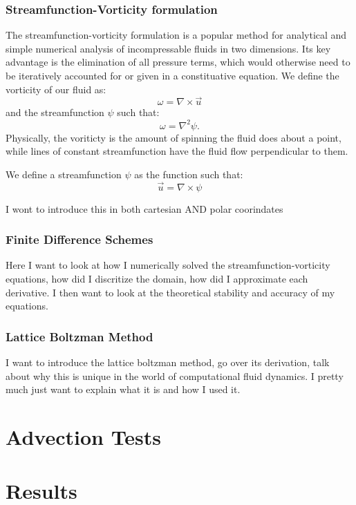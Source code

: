 \documentclass{article}
\begin{document}
\subsubsection*{Streamfunction-Vorticity formulation}
The streamfunction-vorticity formulation is a popular method for analytical and simple numerical analysis of incompressable fluids in two dimensions. Its key advantage is the elimination of all pressure terms, which would otherwise need to be iteratively accounted for or given in a constituative equation. We define the vorticity of our fluid as:
\begin{equation}
	\omega = \nabla \times \vec{u}
\end{equation}
and the streamfunction $\psi$ such that:
\begin{equation}
	\omega = \nabla^2 \psi.
\end{equation}
Physically, the voriticty is the amount of spinning the fluid does about a point, while lines of constant streamfunction have the fluid flow perpendicular to them. 






We define a streamfunction $\psi$ as the function such that:
\begin{equation}
	\vec{u} = \nabla \times \psi
\end{equation}






I wont to introduce this in both cartesian AND polar coorindates


\subsubsection*{Finite Difference Schemes}
Here I want to look at how I numerically solved the streamfunction-vorticity equations, 
how did I discritize the domain, how did I approximate each derivative. I then want to look at the theoretical 
stability and accuracy of my equations. 

\subsubsection*{Lattice Boltzman Method}
I want to introduce the lattice boltzman method, go over its derivation, talk about why this is unique 
in the world of computational fluid dynamics. I pretty much just want to explain what it is and how I used it.
\newline


\section*{Advection Tests}

\section*{Results}

\section*{}
\end{document}
